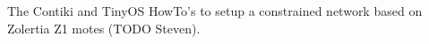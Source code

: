 The \href{https://github.com/koanlogic/webthings/bits}{} Contiki and TinyOS HowTo's to setup a constrained network based on Zolertia Z1 motes (TODO Steven).
